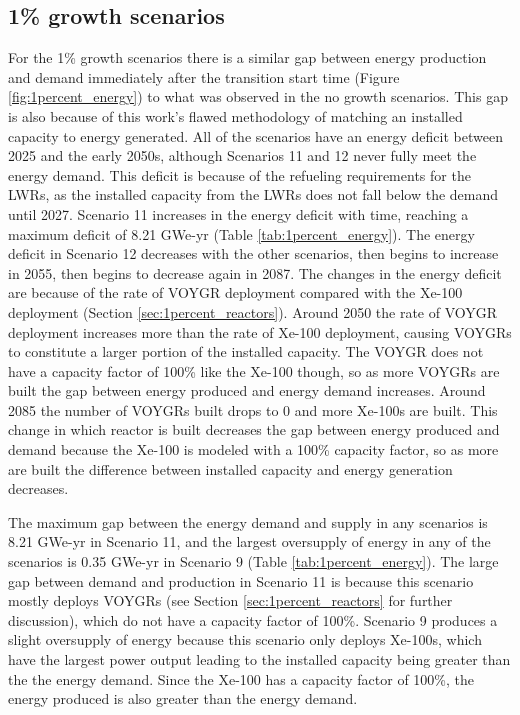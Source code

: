\subsection{1\% growth scenarios}
For the 1\% growth scenarios there is a similar gap between energy 
production and 
demand immediately after the transition start time (Figure 
\ref{fig:1percent_energy}) to what was observed in the no growth 
scenarios. This gap is also because of this work's flawed methodology of 
matching an installed capacity to energy generated. All of the scenarios 
have an energy deficit 
between 2025 and the early 2050s, although Scenarios 11 and 12 never fully 
meet the energy demand. This deficit is because of the refueling 
requirements for the \glspl{LWR}, as the installed capacity from the 
\glspl{LWR} does not fall below the demand until 2027. Scenario 11
increases in the energy deficit with time, reaching a maximum deficit 
of 8.21 GWe-yr (Table \ref{tab:1percent_energy}). The energy deficit in 
Scenario 12 decreases with the other scenarios, then begins to increase 
in 2055, then begins to decrease again in 2087. The changes in the 
energy deficit are because of the rate of VOYGR deployment compared with 
the Xe-100 deployment (Section \ref{sec:1percent_reactors}). Around 2050
the rate of VOYGR deployment increases more than the rate of Xe-100 
deployment, causing VOYGRs to constitute a larger portion of the installed 
capacity. The VOYGR does not have a capacity factor of 100\% like the Xe-100 
though, so as more VOYGRs are built the gap between energy produced and 
energy demand increases. Around 2085 the number of VOYGRs built drops to 
0 and more Xe-100s are built. This change in which reactor is built decreases
the gap between energy produced and demand because the Xe-100 is modeled with 
a 100\% capacity factor, so as more are built the difference between installed 
capacity and energy generation decreases. 

The maximum gap between 
the energy demand and supply in any scenarios is 8.21 GWe-yr in Scenario 11, 
and the largest oversupply of energy in any of the scenarios is 
0.35 GWe-yr in Scenario 9 (Table \ref{tab:1percent_energy}). The large gap 
between demand and production in Scenario 11 is because this scenario mostly 
deploys VOYGRs (see Section \ref{sec:1percent_reactors} for further 
discussion), which do not 
have a capacity factor of 100\%. Scenario 9 produces a slight oversupply 
of energy because this scenario only deploys Xe-100s, which have the largest 
power output leading to the installed capacity being greater than the the 
energy demand. Since the Xe-100 has a capacity factor of 100\%, the energy 
produced is also greater than the energy demand. 

